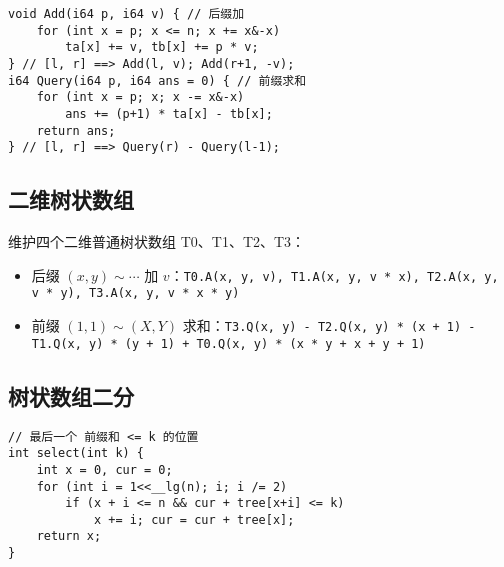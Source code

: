 \documentclass[a4paper,landscape,twocolumn]{ctexart}
\begin{document}
\begin{lstlisting}
void Add(i64 p, i64 v) { // 后缀加
	for (int x = p; x <= n; x += x&-x)
		ta[x] += v, tb[x] += p * v;
} // [l, r] ==> Add(l, v); Add(r+1, -v);
i64 Query(i64 p, i64 ans = 0) { // 前缀求和
	for (int x = p; x; x -= x&-x)
		ans += (p+1) * ta[x] - tb[x];
	return ans;
} // [l, r] ==> Query(r) - Query(l-1);
\end{lstlisting}

\subsection{二维树状数组}

维护四个二维普通树状数组 T0、T1、T2、T3：

\begin{itemize}
\item 后缀 $(x, y) \sim \cdots$ 加 $v$：\texttt{T0.A(x, y, v), T1.A(x, y, v * x), T2.A(x, y, v * y), T3.A(x, y, v * x * y)}
\item 前缀 $(1, 1) \sim (X, Y)$ 求和：\texttt{T3.Q(x, y) - T2.Q(x, y) * (x + 1) - T1.Q(x, y) * (y + 1) + T0.Q(x, y) * (x * y + x + y + 1)}
\end{itemize}


\subsection{树状数组二分}

\begin{lstlisting}
// 最后一个 前缀和 <= k 的位置
int select(int k) {
	int x = 0, cur = 0;
	for (int i = 1<<__lg(n); i; i /= 2)
		if (x + i <= n && cur + tree[x+i] <= k)
			x += i; cur = cur + tree[x];
	return x;
}
\end{lstlisting}
\end{document}
